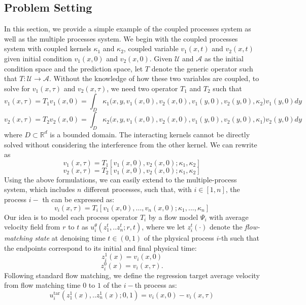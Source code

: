 \documentclass{article}
\begin{document}
\subsection{Problem Setting}
In this section, we provide a simple example of the coupled processes system as well as the multiple processes system. We begin with the coupled processes system with coupled kernels $\kappa_1$ and $\kappa_2$, coupled variable $v_1(x, t)$ and $v_2(x, t)$ given initial condition $v_1(x, 0)$ and $v_2(x, 0)$. Given $\mathcal{U}$ and $\mathcal{A}$ as the initial condition space and the prediction space, let $T$ denote the generic operator such that $T: \mathcal{U} \to \mathcal{A}$. Without the knowledge of how these two variables are coupled, to solve for $v_1(x, \tau)$ and $v_2(x, \tau)$, we need two operator $T_1$ and $T_2$ such that 
\begin{equation}
    v_1(x, \tau) = T_1 v_1(x, 0) = \int_{D} \kappa_1\big(x,y, v_1(x,0), v_2(x,0), v_1(y,0), v_2(y,0), \kappa_2\big) v_1(y,0) dy
\end{equation}
\begin{equation}
    v_2(x, \tau) = T_2 v_2(x, 0) = \int_{D} \kappa_2\big(x,y, v_1(x,0), v_2(x,0), v_1(y,0), v_2(y,0), \kappa_1\big) v_2(y,0) dy
\end{equation}
where $D \subset \mathbb{R}^{d}$ is a bounded domain. The interacting kernels cannot be directly solved without considering the interference from the other kernel. We can rewrite as 
\begin{equation}
    v_1(x, \tau) = T_1 [v_1(x, 0), v_2(x, 0); \kappa_1, \kappa_2] 
\end{equation}
\begin{equation}
    v_2(x, \tau) = T_2 [v_1(x, 0), v_2(x, 0); \kappa_1, \kappa_2] 
\end{equation}
Using the above formulations, we can easily extend to the multiple-process system, which includes $n$ different processes, such that, with $i \in [1, n]$, the process $i-$ th can be expressed as: 
\begin{equation}
    v_i(x, \tau) = T_i[v_1(x, 0), ...,v_n(x, 0); \kappa_1,..., \kappa_n]
\end{equation}
Our idea is to model each process operator $T_i$ by a flow model $\Psi_i$ with average velocity field from $r$ to $t$ as $u^{\theta}_i(z^t_1,..z^t_n; r,t )$, where we let $z^t_i (\cdot)$ denote the \emph{flow-matching state} at denoising time $t \in (0,1)$ of the physical process $i$-th such that the endpoints correspond to its initial and final physical time:  
\begin{equation}
    z^1_i(x) = v_i(x, 0)
\end{equation}
\begin{equation}
    z^0_i(x) = v_i(x, \tau). 
\end{equation}
Following standard flow matching, we define the regression target average velocity from flow matching time $0$ to $1$ of the $i-$th process as: 
\begin{equation}
    u_i^{\text{tar}}(z^1_1(x),..z^1_n(x); 0,1 ) = v_i(x, 0) -  v_i(x, \tau) \label{eq:global_tar_velocity}
\end{equation}
\end{document}
